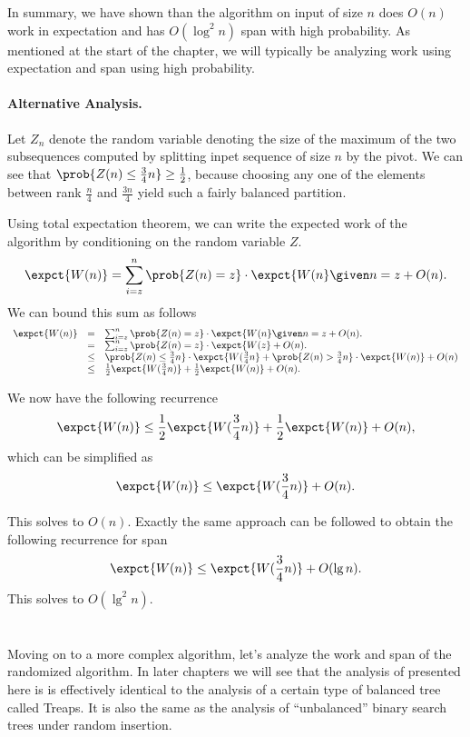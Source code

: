 {In summary, we have shown than the \ksmall{} algorithm on input of
size $n$ does $O(n)$ work in expectation and has $O(\log^2 n)$ span
with high probability.  
%
As mentioned at the start of the chapter, we will typically be
analyzing work using expectation and span using high probability.

\begin{notesonly}
\paragraph{Alternative Analysis.}

Let $Z_n$ denote the random variable denoting the size of the maximum
of the two subsequences computed by splitting inpet sequence of size
$n$ by the pivot.
%
We can see that $\prob{Z(n) \le \frac34 n} \ge \frac12$, because
choosing any one of the elements between rank $\frac{n}{4}$ and
$\frac{3n}{4}$ yield such a fairly balanced partition.
%

Using total expectation theorem, we can write the expected work of the
algorithm by conditioning on the random variable $Z$.
\[
\expct{W(n)} = \sum_{i = z}^{n}{\prob{Z(n) = z} \cdot \expct{W(n}  \given n = z} + O(n).
\]
We can bound this sum as follows
\[
\begin{array}{lll}
\expct{W(n)} 
& = & 
\sum_{i = z}^{n}{\prob{Z(n) = z} \cdot \expct{W(n}  \given n = z} + O(n).
\\
& = & 
\sum_{i = z}^{n}{\prob{Z(n) = z} \cdot \expct{W(z}} + O(n).
\\
& \le & 
\prob{Z(n) \le \frac34 n} \cdot \expct{W(\frac34 n} 
+ 
\prob{Z(n) > \frac34 n} \cdot \expct{W(n)}
+
O(n)
\\
& \le & \frac12 \expct{W(\frac34 n)} +  \frac12 \expct{W(n)} + O(n).
\end{array}
\]

We now have the following recurrence
\[
\expct{W(n)} 
\le 
\frac12 \expct{W(\frac34 n)} +  \frac12 \expct{W(n)} + O(n),
\]
which can be simplified as 
\[
\expct{W(n)} 
\le 
\expct{W(\frac34 n)} + O(n).
\]

This solves to $O(n)$.  Exactly the same approach can be followed to
obtain the following recurrence for span
\[
\expct{W(n)} 
\le 
\expct{W(\frac34 n)} + O(\lg{n}).
\]
This solves to $O(\lg^2{n})$.
\end{notesonly}

\section{\Qsort}
Moving on to a more complex algorithm, let's analyze the work and span
of the randomized \qsort{} algorithm.
%
In later chapters we will see that the analysis of \qsort{} presented
here is is effectively identical to the analysis of a certain type of
balanced tree called Treaps.  
%
It is also the same as the analysis of ``unbalanced'' binary search
trees under random insertion.


}
